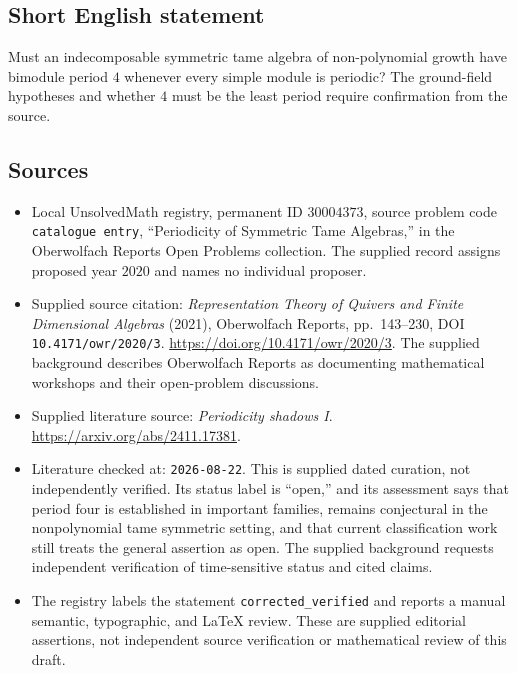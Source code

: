 \documentclass[11pt]{article}
\begin{document}
\subsection{Short English statement}
Must an indecomposable symmetric tame algebra of non-polynomial growth have bimodule period \(4\) whenever every simple module is periodic? The ground-field hypotheses and whether \(4\) must be the least period require confirmation from the source.
\subsection{Sources}
\begin{itemize}
\item Local UnsolvedMath registry, permanent ID \(30004373\), source problem code \texttt{catalogue entry}, ``Periodicity of Symmetric Tame Algebras,'' in the Oberwolfach Reports Open Problems collection. The supplied record assigns proposed year \(2020\) and names no individual proposer.
\item Supplied source citation: \emph{Representation Theory of Quivers and Finite Dimensional Algebras} (2021), Oberwolfach Reports, pp.\ 143--230, DOI \texttt{10.4171/owr/2020/3}. \url{https://doi.org/10.4171/owr/2020/3}. The supplied background describes Oberwolfach Reports as documenting mathematical workshops and their open-problem discussions.
\item Supplied literature source: \emph{Periodicity shadows I}. \url{https://arxiv.org/abs/2411.17381}.
\item Literature checked at: \texttt{2026-08-22}. This is supplied dated curation, not independently verified. Its status label is ``open,'' and its assessment says that period four is established in important families, remains conjectural in the nonpolynomial tame symmetric setting, and that current classification work still treats the general assertion as open. The supplied background requests independent verification of time-sensitive status and cited claims.
\item The registry labels the statement \texttt{corrected\_verified} and reports a manual semantic, typographic, and LaTeX review. These are supplied editorial assertions, not independent source verification or mathematical review of this draft.
\end{itemize}
\end{document}
